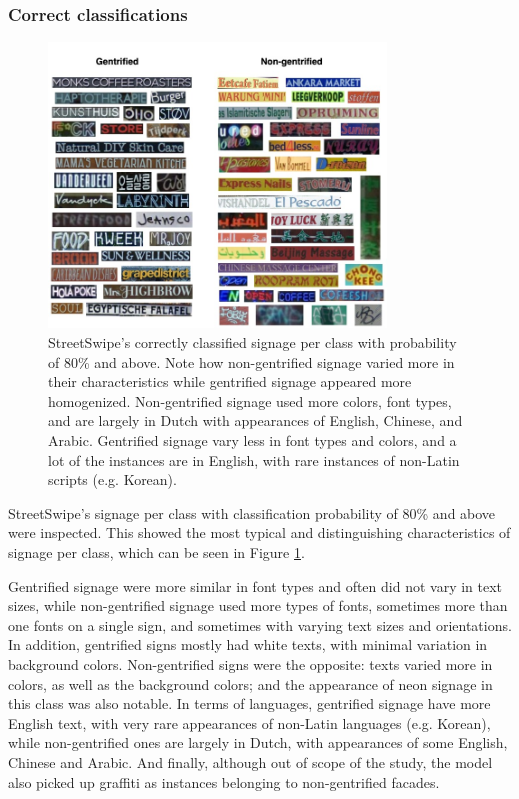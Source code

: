 \subsubsection{Correct classifications}

\begin{figure}[]
    \centering
    \includegraphics[width=0.8\textwidth]{media/results/output_vis.jpg}
    \caption{StreetSwipe's correctly classified signage per class with probability of 80\% and above. Note how non-gentrified signage varied more in their characteristics while gentrified signage appeared more homogenized. Non-gentrified signage used more colors, font types, and are largely in Dutch with appearances of English, Chinese, and Arabic. Gentrified signage vary less in font types and colors, and a lot of the instances are in English, with rare instances of non-Latin scripts (e.g. Korean).}
    \label{fig:output_vis}
\end{figure}

StreetSwipe's signage per class with classification probability of 80\% and above were inspected. This showed the most typical and distinguishing characteristics of signage per class, which can be seen in Figure \ref{fig:output_vis}.

Gentrified signage were more similar in font types and often did not vary in text sizes, while non-gentrified signage used more types of fonts, sometimes more than one fonts on a single sign, and sometimes with varying text sizes and orientations. In addition, gentrified signs mostly had white texts, with minimal variation in background colors. Non-gentrified signs were the opposite: texts varied more in colors, as well as the background colors; and the appearance of neon signage in this class was also notable. In terms of languages, gentrified signage have more English text, with very rare appearances of non-Latin languages (e.g. Korean), while non-gentrified ones are largely in Dutch, with appearances of some English, Chinese and Arabic. And finally, although out of scope of the study, the model also picked up graffiti as instances belonging to non-gentrified facades.


